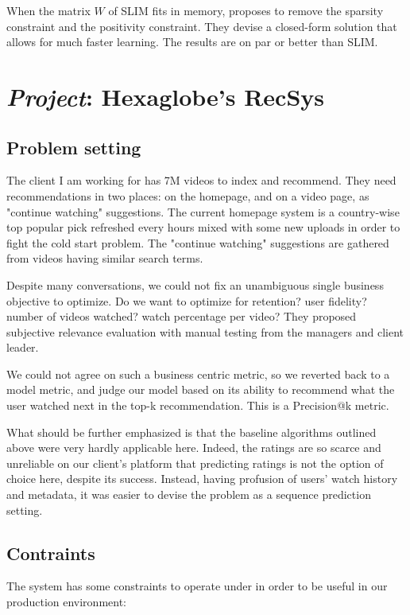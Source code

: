 When the matrix $W$ of SLIM fits in memory, \citet{easer} proposes to remove the sparsity constraint and the positivity constraint. They devise a closed-form solution that allows for much faster learning. The results are on par or better than SLIM.

\section{\emph{\arr Project}: Hexaglobe's RecSys}

\subsection{Problem setting}

The client I am working for has 7M videos to index and recommend. They need recommendations in two places: on the homepage, and on a video page, as "continue watching" suggestions. The current homepage system is a country-wise top popular pick refreshed every hours mixed with some new uploads in order to fight the cold start problem. The "continue watching" suggestions are gathered from videos having similar search terms.

Despite many conversations, we could not fix an unambiguous single business objective to optimize. Do we want to optimize for retention? user fidelity? number of videos watched? watch percentage per video? They proposed subjective relevance evaluation with manual testing from the managers and client leader.

We could not agree on such a business centric metric, so we reverted back to a model metric, and judge our model based on its ability to recommend what the user watched next in the top-k recommendation. This is a Precision@k metric.

What should be further emphasized is that the baseline algorithms outlined above were very hardly applicable here. Indeed, the ratings are so scarce and unreliable on our client's platform that predicting ratings is not the option of choice here, despite its success. Instead, having profusion of users' watch history and metadata, it was easier to devise the problem as a sequence prediction setting.

\subsection{Contraints}

The system has some constraints to operate under in order to be useful in our production environment:

